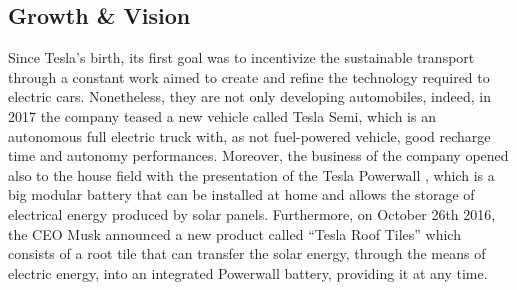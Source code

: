 \subsection{Growth \& Vision}
Since Tesla's birth, its first goal was to incentivize the sustainable transport through a constant work aimed to create and refine the technology required to electric cars. Nonetheless, they are not only developing automobiles, indeed, in 2017 the company teased a new vehicle called Tesla Semi, which is an autonomous full electric truck with, as not fuel-powered  vehicle, good recharge time and autonomy performances. %
Moreover, the business of the company opened also to the house field with the presentation of the Tesla Powerwall \cite{Powerwall}, which is a big modular battery that can be installed at home and allows the storage of electrical energy produced by solar panels. Furthermore, on October 26th 2016, the CEO Musk announced a new product called “Tesla Roof Tiles” which consists of a root tile that can transfer the solar energy, through the means of electric energy, into an integrated Powerwall battery, providing it at any time.


